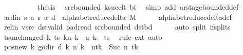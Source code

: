 \begin{isabellebody}
\ \ \ \ \isamarkupfalse%
\isanewline
\ \ \ \ \isamarkupfalse%
\ {\isacharquery}{\kern0pt}thesis\ \isamarkupfalse%
\ src{\isacharunderscore}{\kern0pt}bounded\ ksucc{\isacharunderscore}{\kern0pt}lt\ bt\ \isamarkupfalse%
\ {\isacharparenleft}{\kern0pt}simp\ add{\isacharcolon}{\kern0pt}\ ar{\isacharunderscore}{\kern0pt}stage{\isacharunderscore}{\kern0pt}bounded{\isacharunderscore}{\kern0pt}def{\isacharparenright}{\kern0pt}\isanewline
\ \ \isamarkupfalse%
\isanewline
\ \ \isamarkupfalse%
\ ard{\isacharunderscore}{\kern0pt}in{\isacharcolon}{\kern0pt}\ {\isachardoublequoteopen}{\isacharparenleft}{\kern0pt}{\isacharquery}{\kern0pt}s{\isacharcomma}{\kern0pt}\ {\isacharquery}{\kern0pt}a{\isacharcomma}{\kern0pt}\ {\isacharquery}{\kern0pt}s{\isacharprime}{\kern0pt}{\isacharcomma}{\kern0pt}\ {\isacharquery}{\kern0pt}a{\isacharcomma}{\kern0pt}\ {\isacharquery}{\kern0pt}d{\isacharparenright}{\kern0pt}\ {\isasymin}\ alphabet{\isacharunderscore}{\kern0pt}reduce{\isacharunderscore}{\kern0pt}delta\ M{\isachardoublequoteclose}\isanewline
\ \ \ \ \isamarkupfalse%
\ alphabet{\isacharunderscore}{\kern0pt}reduce{\isacharunderscore}{\kern0pt}delta{\isacharunderscore}{\kern0pt}def\isanewline
\ \ \ \ \isamarkupfalse%
\ rel{\isacharunderscore}{\kern0pt}in\ vsrc\ dst{\isacharunderscore}{\kern0pt}valid\ pad{\isacharunderscore}{\kern0pt}read\ src{\isacharunderscore}{\kern0pt}bounded\ dst{\isacharunderscore}{\kern0pt}bd\isanewline
\ \ \ \ \isamarkupfalse%
\ {\isacharparenleft}{\kern0pt}auto\ split{\isacharcolon}{\kern0pt}\ if{\isacharunderscore}{\kern0pt}splits{\isacharparenright}{\kern0pt}\isanewline
\ \ \isamarkupfalse%
\ ts{\isacharunderscore}{\kern0pt}unchanged{\isacharcolon}{\kern0pt}\ {\isachardoublequoteopen}{\isacharparenleft}{\kern0pt}{\isasymlambda}k{\isachardot}{\kern0pt}\ {\isacharparenleft}{\kern0pt}ts\ k{\isacharparenright}{\kern0pt}{\isacharparenleft}{\kern0pt}n\ k\ {\isacharcolon}{\kern0pt}{\isacharequal}{\kern0pt}\ {\isacharquery}{\kern0pt}a\ k{\isacharparenright}{\kern0pt}{\isacharparenright}{\kern0pt}\ {\isacharequal}{\kern0pt}\ ts{\isachardoublequoteclose}\ \isamarkupfalse%
\ {\isacharparenleft}{\kern0pt}rule\ ext{\isacharparenright}{\kern0pt}\ auto\isanewline
\ \ \isamarkupfalse%
\ pos{\isacharunderscore}{\kern0pt}new{\isacharcolon}{\kern0pt}\ {\isachardoublequoteopen}{\isacharparenleft}{\kern0pt}{\isasymlambda}k{\isachardot}{\kern0pt}\ go{\isacharunderscore}{\kern0pt}dir\ {\isacharparenleft}{\kern0pt}{\isacharquery}{\kern0pt}d\ k{\isacharparenright}{\kern0pt}\ {\isacharparenleft}{\kern0pt}n\ k{\isacharparenright}{\kern0pt}{\isacharparenright}{\kern0pt}\ {\isacharequal}{\kern0pt}\ n{\isacharparenleft}{\kern0pt}tk\ {\isacharcolon}{\kern0pt}{\isacharequal}{\kern0pt}\ Suc\ {\isacharparenleft}{\kern0pt}n\ tk{\isacharparenright}{\kern0pt}{\isacharparenright}{\kern0pt}{\isachardoublequoteclose}\isanewline

\end{isabellebody}
